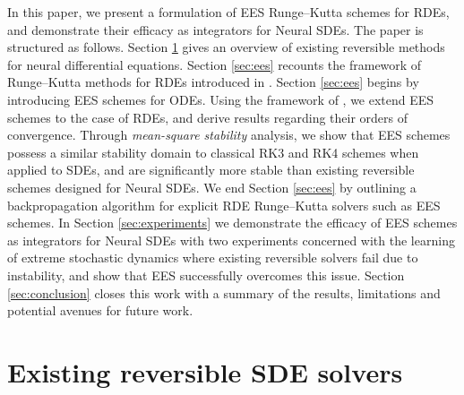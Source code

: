 \documentclass{article} %
\theoremstyle{definition}
\theoremstyle{remark}
\begin{document}
In this paper, we present a formulation of EES Runge--Kutta schemes for RDEs, and demonstrate their efficacy as integrators for Neural SDEs. The paper is structured as follows. Section \ref{sec:rev_solvers} gives an overview of existing reversible methods for neural differential equations. Section \ref{sec:ees} recounts the framework of Runge--Kutta methods for RDEs introduced in \cite{redmann2020runge}. Section \ref{sec:ees} begins by introducing EES schemes for ODEs. Using the framework of \cite{redmann2020runge}, we extend EES schemes to the case of RDEs, and derive results regarding their orders of convergence. Through \emph{mean-square stability} analysis, we show that EES schemes possess a similar stability domain to classical RK3 and RK4 schemes when applied to SDEs, and are significantly more stable than existing reversible schemes designed for Neural SDEs. We end Section \ref{sec:ees} by outlining a backpropagation algorithm for explicit RDE Runge--Kutta solvers such as EES schemes. In Section \ref{sec:experiments} we demonstrate the efficacy of EES schemes as integrators for Neural SDEs with two experiments concerned with the learning of extreme stochastic dynamics where existing reversible solvers fail due to instability, and show that EES successfully overcomes this issue. Section \ref{sec:conclusion} closes this work with a summary of the results, limitations and potential avenues for future work.

\section{Existing reversible SDE solvers}\label{sec:rev_solvers}
\end{document}
